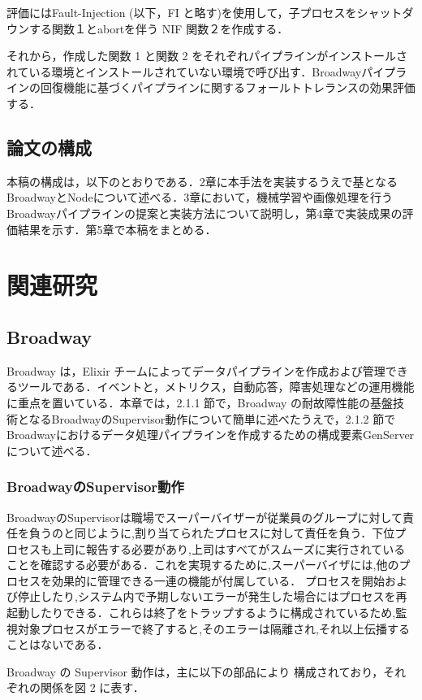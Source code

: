 \documentclass[a4paper]{jreport}	%
\begin{document}
評価にはFault-Injection (以下，FI と略す)を使用して，子プロセスをシャットダウンする関数１とabortを伴う NIF 関数２を作成する．

それから，作成した関数 1 と関数 2 をそれぞれパイプラインがインストールされている環境とインストールされていない環境で呼び出す．Broadwayパイプラインの回復機能に基づくパイプラインに関するフォールトトレランスの効果評価する．

\section{論文の構成}
本稿の構成は，以下のとおりである．2章に本手法を実装するうえで基となるBroadwayとNodeについて述べる．3章において，機械学習や画像処理を行うBroadwayパイプラインの提案と実装方法について説明し，第4章で実装成果の評価結果を示す．第5章で本稿をまとめる．


\chapter{関連研究}
\section{Broadway}
Broadway は，Elixir チームによってデータパイプラインを作成および管理できるツールである．イベントと，メトリクス，自動応答，障害処理などの運用機能に重点を置いている\cite{D}．本章では，2.1.1 節で，Broadway の耐故障性能の基盤技術となるBroadwayのSupervisor動作について簡単に述べたうえで，2.1.2 節で Broadwayにおけるデータ処理パイプラインを作成するための構成要素GenServerについて述べる．
\subsection{BroadwayのSupervisor動作}
BroadwayのSupervisorは職場でスーパーバイザーが従業員のグループに対して責任を負うのと同じように,割り当てられたプロセスに対して責任を負う．下位プロセスも上司に報告する必要があり,上司はすべてがスムーズに実行されていることを確認する必要がある．これを実現するために,スーパーバイザには,他のプロセスを効果的に管理できる一連の機能が付属している． プロセスを開始および停止したり,システム内で予期しないエラーが発生した場合にはプロセスを再起動したりできる．これらは終了をトラップするように構成されているため,監視対象プロセスがエラーで終了すると,そのエラーは隔離され,それ以上伝播することはないである． 

Broadway の Supervisor 動作は，主に以下の部品により 構成されており，それぞれの関係を図 2 に表す．
\end{document}
